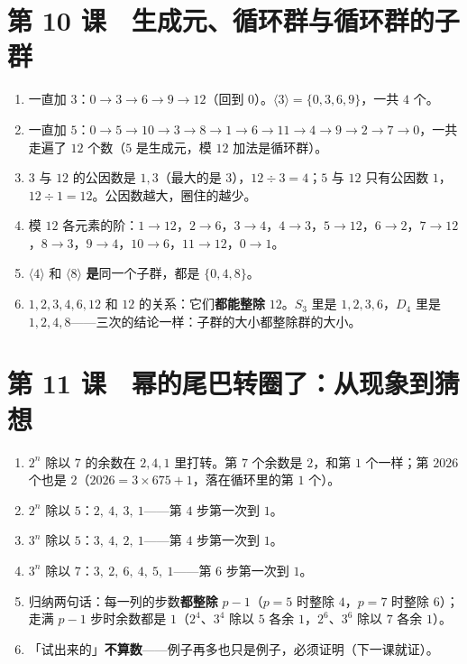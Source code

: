 \section*{第 10 课　生成元、循环群与循环群的子群}
\begin{enumerate}
  \item 一直加 \(3\)：\(0\to3\to6\to9\to12\)（回到 \(0\)）。\(\langle3\rangle=\{0,3,6,9\}\)，一共 \(4\) 个。
  \item 一直加 \(5\)：\(0\to5\to10\to3\to8\to1\to6\to11\to4\to9\to2\to7\to0\)，一共走遍了 \(12\) 个数（\(5\) 是生成元，模 \(12\) 加法是循环群）。
  \item \(3\) 与 \(12\) 的公因数是 \(1,3\)（最大的是 \(3\)），\(12\div3=4\)；\(5\) 与 \(12\) 只有公因数 \(1\)，\(12\div1=12\)。公因数越大，圈住的越少。
  \item 模 \(12\) 各元素的阶：\(1\to12\)，\(2\to6\)，\(3\to4\)，\(4\to3\)，\(5\to12\)，\(6\to2\)，\(7\to12\)，\(8\to3\)，\(9\to4\)，\(10\to6\)，\(11\to12\)，\(0\to1\)。
  \item \(\langle4\rangle\) 和 \(\langle8\rangle\) \textbf{是}同一个子群，都是 \(\{0,4,8\}\)。
  \item \(1,2,3,4,6,12\) 和 \(12\) 的关系：它们\textbf{都能整除} \(12\)。\(S_3\) 里是 \(1,2,3,6\)，\(D_4\) 里是 \(1,2,4,8\)——三次的结论一样：子群的大小都整除群的大小。
\end{enumerate}

\section*{第 11 课　幂的尾巴转圈了：从现象到猜想}
\begin{enumerate}
  \item \(2^n\) 除以 \(7\) 的余数在 \(2,4,1\) 里打转。第 \(7\) 个余数是 \(2\)，和第 \(1\) 个一样；第 \(2026\) 个也是 \(2\)（\(2026=3\times675+1\)，落在循环里的第 \(1\) 个）。
  \item \(2^n\) 除以 \(5\)：\(2,\ 4,\ 3,\ 1\)——第 \(4\) 步第一次到 \(1\)。
  \item \(3^n\) 除以 \(5\)：\(3,\ 4,\ 2,\ 1\)——第 \(4\) 步第一次到 \(1\)。
  \item \(3^n\) 除以 \(7\)：\(3,\ 2,\ 6,\ 4,\ 5,\ 1\)——第 \(6\) 步第一次到 \(1\)。
  \item 归纳两句话：每一列的步数\textbf{都整除} \(p-1\)（\(p=5\) 时整除 \(4\)，\(p=7\) 时整除 \(6\)）；走满 \(p-1\) 步时余数都是 \(1\)（\(2^4\)、\(3^4\) 除以 \(5\) 各余 \(1\)，\(2^6\)、\(3^6\) 除以 \(7\) 各余 \(1\)）。
  \item 「试出来的」\textbf{不算数}——例子再多也只是例子，必须证明（下一课就证）。
\end{enumerate}

